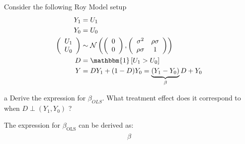 \documentclass{article}
\begin{document}
Consider the following Roy Model setup
\textbf{\begin{align*}
\begin{aligned}
    Y_{1} &=U_{1} \\
    Y_{0} &=U_{0} \\
    \left(\begin{array}{c}
    U_{1} \\
    U_{0}
    \end{array}\right) & \sim \mathcal{N}\left(\left(\begin{array}{l}
    0 \\
    0
    \end{array}\right),\left(\begin{array}{cc}
    \sigma^{2} & \rho \sigma \\
    \rho \sigma & 1
    \end{array}\right)\right) \\
    D &=\mathbbm{1}\left[U_{1}>U_{0}\right] \\
    Y &=D Y_{1}+(1-D) Y_{0}=\underbrace{\left(Y_{1}-Y_{0}\right)}_{\beta} D+Y_{0}
\end{aligned}
\end{align*}}

\begin{problem}{a}
Derive the expression for $\beta_{O L S}$. What treatment effect does it correspond to when $D \perp\left(Y_{1}, Y_{0}\right)$ ?
\end{problem}
\begin{solution}
The expression for $\beta_\text{OLS}$ can be derived as:
\begin{align}
\begin{split}
    \beta
\end{split}
\end{align}
\end{solution}
\end{document}
